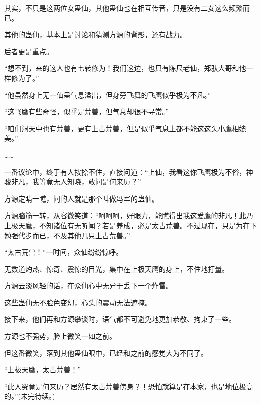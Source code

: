 \begin{this_body}
其实，不只是这两位女蛊仙，其他蛊仙也在相互传音，只是没有二女这么频繁而已。

其他的蛊仙，基本上是讨论和猜测方源的背影，还有战力。

后者更是重点。

“想不到，来的这人也有七转修为！我们这边，也只有陈尺老仙，郑驮大哥和他一样修为了。”

“他虽然身上无一仙蛊气息溢出，但身旁飞舞的飞鹰似乎极为不凡。”

“这飞鹰有些奇怪，似乎是荒兽，但气息却很不寻常。”

“咱们洞天中也有荒兽，更有上古荒兽，但是似乎气息上都不能这这头小鹰相媲美。”

……

一番议论中，终于有人按捺不住，直接问道：“上仙，我看这你飞鹰极为不俗，神骏非凡，我等竟无人知晓，敢问是何来历？”

方源定睛一瞧，问的人就是那个叫做冯军的蛊仙。

方源脑筋一转，从容微笑道：“呵呵呵，好眼力，能瞧得出我这爱鹰的非凡！此乃上极天鹰，不知诸位有无听闻？若是养成，必是太古荒兽。不过现在，只是为在下勉强代步而已，不及其他几只上古荒兽。”

“太古荒兽！”一时间，众仙纷纷惊呼。

无数道灼热、惊奇、震惊的目光，集中在上极天鹰的身上，不住地打量。

方源云淡风轻的话，在众仙心中无异于丢下一个炸雷。

这些蛊仙无不脸色变幻，心头的震动无法遮掩。

接下来，他们再和方源攀谈时，语气都不可避免地更加恭敬、拘束了一些。

方源也不强势，脸上微笑一如之前。

但这番微笑，落到其他蛊仙眼中，已经和之前的感觉大为不同了。

“上极天鹰，太古荒兽！”

“此人究竟是何来历？居然有太古荒兽傍身？！恐怕就算是在本家，也是地位极高的。”(未完待续。)

\end{this_body}

